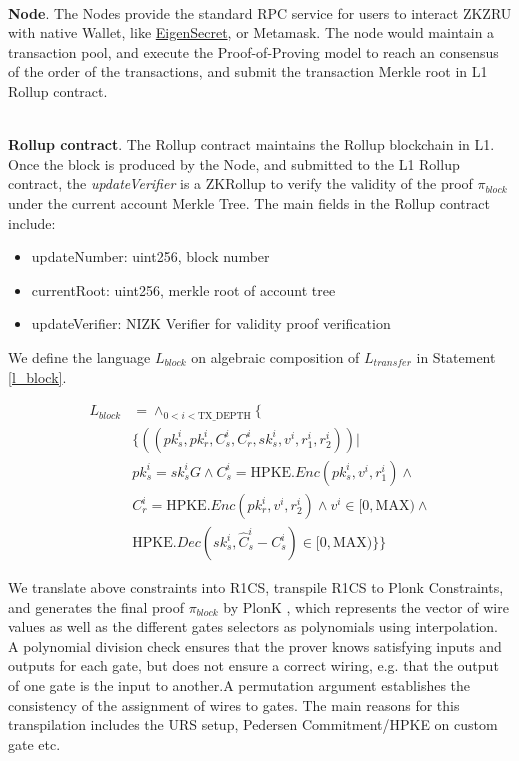 \documentclass{article}
\begin{document}
~\\
\noindent\textbf{Node}. The Nodes provide the standard RPC service for users to interact ZKZRU with native Wallet, like \href{https://secret.eigen.cash}{EigenSecret}, or Metamask. The node would maintain a transaction pool, and execute the Proof-of-Proving model to reach an consensus of the order of the transactions, and submit the transaction Merkle root in L1 Rollup contract.


~\\
\noindent\textbf{Rollup contract}. The Rollup contract maintains the Rollup blockchain in L1. Once the block is produced by the Node, and submitted to the L1 Rollup contract, the \textit{updateVerifier} is a ZKRollup to verify the validity of the proof $\pi_{block}$ under the current account Merkle Tree. The main fields in the Rollup contract include:
\begin{itemize}
    \item updateNumber: uint256, block number
    \item currentRoot: uint256, merkle root of account tree
    \item updateVerifier: NIZK Verifier for validity proof verification
\end{itemize}

We define the language $L_{block}$ on algebraic composition of $L_{transfer}$ in Statement \ref{l_block}.

\begin{equation}
\begin{aligned} \label{l_block}
    L_{block} &= \wedge_{0 < i < \mbox{TX\_DEPTH}} \{  \\
        &\{((pk_s^i, pk_r^i, C_s^i, C_r^i, sk_s^i, v^i, r_1^i, r_2^i)) | \\ 
        &pk_s^i = sk_s^iG \land C_s^i = \mbox{HPKE}.Enc(pk_s^i,v^i, r_1^i) \land \\
        &C_r^i =  \mbox{HPKE}.Enc(pk_r^i,v^i, r_2^i) \land v^i \in [0, \mbox{MAX}) \land \\
        &\mbox{HPKE}.Dec(sk_s^i, \hat{C}_s^i - C_s^i) \in [0, \mbox{MAX})\}\}
\end{aligned}
\end{equation}

We translate above constraints into R1CS, transpile R1CS to Plonk Constraints, and generates the final proof $\pi_{block}$ by PlonK \cite{gabizon2019plonk}, which represents the vector of wire values as well as the different gates selectors as polynomials using interpolation. A polynomial division check ensures that the prover knows satisfying inputs and outputs for each gate, but does not ensure a correct wiring, e.g. that the output of one gate is the input to another.A permutation argument establishes the consistency of the assignment of wires to gates. The main reasons for this transpilation includes the URS setup, Pedersen Commitment/HPKE on custom gate etc.
\end{document}
